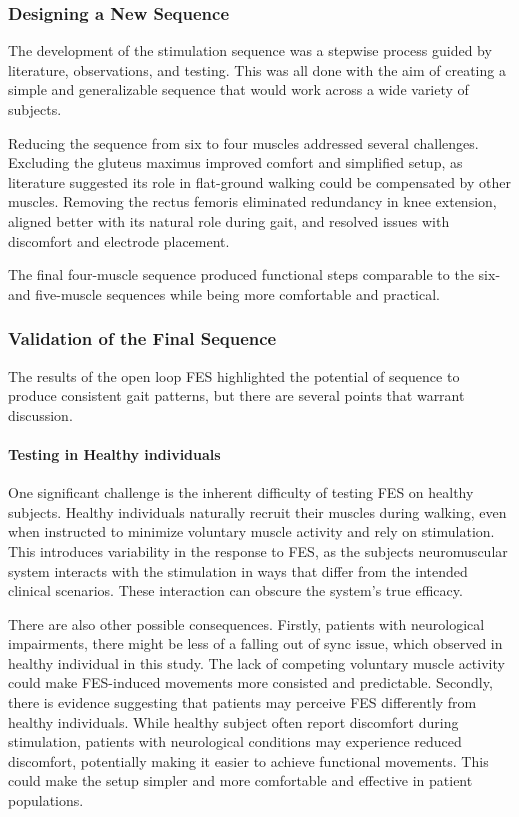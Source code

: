 \subsubsection{Designing a New Sequence}
The development of the stimulation sequence was a stepwise process guided by literature, observations, and testing. This was all done with the aim of creating a simple and generalizable sequence that would work across a wide variety of subjects.

Reducing the sequence from six to four muscles addressed several challenges. Excluding the gluteus maximus improved comfort and simplified setup, as literature suggested its role in flat-ground walking could be compensated by other muscles. Removing the rectus femoris eliminated redundancy in knee extension, aligned better with its natural role during gait, and resolved issues with discomfort and electrode placement.

The final four-muscle sequence produced functional steps comparable to the six- and five-muscle sequences while being more comfortable and practical.

\subsubsection{Validation of the Final Sequence}
The results of the open loop FES highlighted the potential of sequence to produce consistent gait patterns, but there are several points that warrant discussion.
\newline

\paragraph*{Testing in Healthy individuals}

One significant challenge is the inherent difficulty of testing FES on healthy subjects. Healthy individuals naturally recruit their muscles during walking, even when instructed to minimize voluntary muscle activity and rely on stimulation. This introduces variability in the response to FES, as the subjects neuromuscular system interacts with the stimulation in ways that differ from the intended clinical scenarios. These interaction can obscure the system's true efficacy.

There are also other possible consequences. Firstly, patients with neurological impairments, there might be less of a falling out of sync issue, which observed in healthy individual in this study. The lack of competing voluntary muscle activity could make FES-induced movements more consisted and predictable. Secondly, there is evidence suggesting that patients may perceive FES differently from healthy individuals. While healthy subject often report discomfort during stimulation, patients with neurological conditions may experience reduced discomfort, potentially making it easier to achieve functional movements. This could make the setup simpler and more comfortable and effective in patient populations. 



